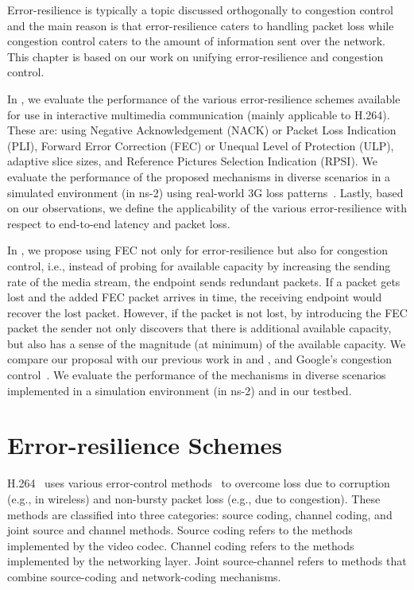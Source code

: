 Error-resilience is typically a topic discussed orthogonally to congestion
control and the main reason is that error-resilience caters to handling
packet loss while congestion control caters to the amount of information sent
over the network. This chapter is based on our work on unifying
error-resilience and congestion control.

In , we evaluate the performance of the various
error-resilience schemes available for use in interactive multimedia
communication (mainly applicable to H.264). These are: using Negative
Acknowledgement (NACK) or Packet Loss Indication (PLI), Forward Error
Correction (FEC) or Unequal Level of Protection (ULP), adaptive slice sizes,
and Reference Pictures Selection Indication (RPSI). We evaluate the
performance of the proposed mechanisms in diverse scenarios in a simulated
environment (in ns-2) using real-world 3G loss patterns~\cite{3gppSim}.
Lastly, based on our observations, we define the applicability of the various
error-resilience with respect to end-to-end latency and packet loss.

In , we propose using FEC not only for error-resilience but
also for congestion control, i.e., instead of probing for available capacity
by increasing the sending rate of the media stream, the endpoint sends
redundant packets. If a packet gets lost and the added FEC packet arrives in
time, the receiving endpoint would recover the lost packet. However, if the
packet is not lost, by introducing the FEC packet the sender not only
discovers that there is additional available capacity, but also has a sense of
the magnitude (at minimum) of the available capacity. We compare our proposal
with our previous work in  and , and Google's
congestion control~\cite{draft.rrtcc}. We evaluate the performance of the
mechanisms in diverse scenarios implemented in a simulation environment (in
ns-2) and in our testbed.

\section{Error-resilience Schemes}

H.264~\cite{h264} uses various error-control methods~\cite{err_res_h264_std,
wang98error, wang00review, 310669} to overcome loss due to corruption (e.g.,
in wireless) and non-bursty packet loss (e.g., due to congestion). These
methods are classified into three categories: source coding, channel coding,
and joint source and channel methods. Source coding refers to the methods
implemented by the video codec. Channel coding refers to the methods
implemented by the networking layer. Joint source-channel refers to methods
that combine source-coding and network-coding mechanisms.

